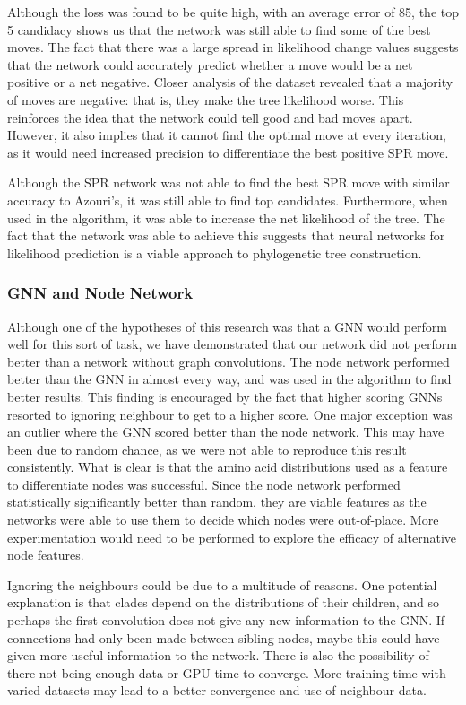 \documentclass{mpaper}
\begin{document}
Although the loss was found to be quite high, with an average error of 85, the top 5 candidacy shows us that the network was still able to find some of the best moves. The fact that there was a large spread in likelihood change values suggests that the network could accurately predict whether a move would be a net positive or a net negative. Closer analysis of the dataset revealed that a majority of moves are negative: that is, they make the tree likelihood worse. This reinforces the idea that the network could tell good and bad moves apart. However, it also implies that it cannot find the optimal move at every iteration, as it would need increased precision to differentiate the best positive SPR move.

Although the SPR network was not able to find the best SPR move with similar accuracy to Azouri's, it was still able to find top candidates. Furthermore, when used in the algorithm, it was able to increase the net likelihood of the tree. The fact that the network was able to achieve this suggests that neural networks for likelihood prediction is a viable approach to phylogenetic tree construction.

\subsubsection{GNN and Node Network}

Although one of the hypotheses of this research was that a GNN would perform well for this sort of task, we have demonstrated that our network did not perform better than a network without graph convolutions. The node network performed better than the GNN in almost every way, and was used in the algorithm to find better results. This finding is encouraged by the fact that higher scoring GNNs resorted to ignoring neighbour to get to a higher score. One major exception was an outlier where the GNN scored better than the node network. This may have been due to random chance, as we were not able to reproduce this result consistently. What is clear is that the amino acid distributions used as a feature to differentiate nodes was successful. Since the node network performed statistically significantly better than random, they are viable features as the networks were able to use them to decide which nodes were out-of-place. More experimentation would need to be performed to explore the efficacy of alternative node features.

Ignoring the neighbours could be due to a multitude of reasons. One potential explanation is that clades depend on the distributions of their children, and so perhaps the first convolution does not give any new information to the GNN. If connections had only been made between sibling nodes, maybe this could have given more useful information to the network. There is also the possibility of there not being enough data or GPU time to converge. More training time with varied datasets may lead to a better convergence and use of neighbour data.
\end{document}
